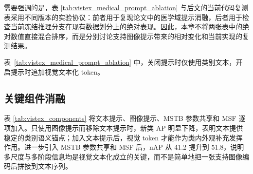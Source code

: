 需要强调的是，表 \ref{tab:vistex_medical_prompt_ablation} 与后文的当前代码复测表采用不同版本的实验协议：前者用于复现论文中的医学域提示消融，后者用于检查当前冻结推理分支在现有数据划分上的绝对表现。因此，本章不将两张表中的绝对数值直接混合排序，而是分别讨论支持图像提示带来的相对变化和当前实现的复测结果。

\begin{table}[t]
  \centering
  \caption{医学域图像提示消融}
  \label{tab:vistex_medical_prompt_ablation}
\end{table}
表~\ref{tab:vistex_medical_prompt_ablation} 中，关闭提示时仅使用类别文本，开启提示时追加视觉文本化 token。


\subsection{关键组件消融}
表 \ref{tab:vistex_components} 将文本提示、图像提示、MSTB 参数共享和 MSF 逐项加入。只使用图像提示而移除文本提示时，新类 AP 明显下降，表明文本提供稳定的类别语义锚点；加入文本提示后，视觉 token 才能作为类内外观补充发挥作用。进一步引入 MSTB 参数共享和 MSF 后，nAP 从 41.2 提升到 51.8，说明多尺度与多阶段信息均是视觉文本化成立的关键，而不是简单地把一张支持图像编码后拼接到文本序列。

